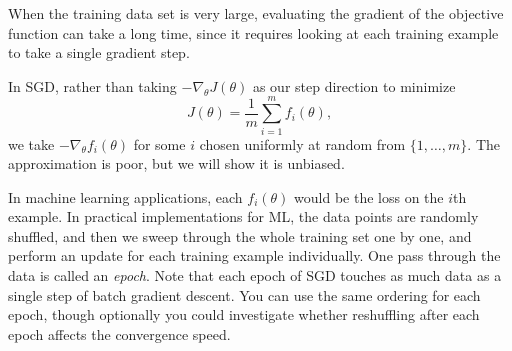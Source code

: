 \documentclass{article}
\begin{document}
When the training data set is very large, evaluating the
gradient of the objective function can take a long time, since it
requires looking at each training example to take a single gradient
step. 

In SGD, rather than taking $-\nabla_{\theta} J(\theta)$
as our step direction to minimize 
\[
J(\theta)=\frac{1}{m}\sum_{i=1}^{m}f_{i}(\theta), 
\]
we take $-\nabla_\theta f_{i}(\theta)$ for some $i$
chosen uniformly at random from $\{1,\ldots,m\}$. The approximation
is poor, but we will show it is unbiased. 

In machine learning applications, each $f_{i}(\theta)$
would be the loss on the $i$th example. In
practical implementations for ML, the data points are randomly shuffled, and then we sweep through the whole training set one by
one, and perform an update for each training example individually.
One pass through the data is called an \emph{epoch}. Note that each
epoch of SGD touches as much data as a single step of batch gradient
descent. You can use the same ordering for each epoch, though optionally
you could investigate whether reshuffling after each epoch affects
the convergence speed. 
\end{document}
